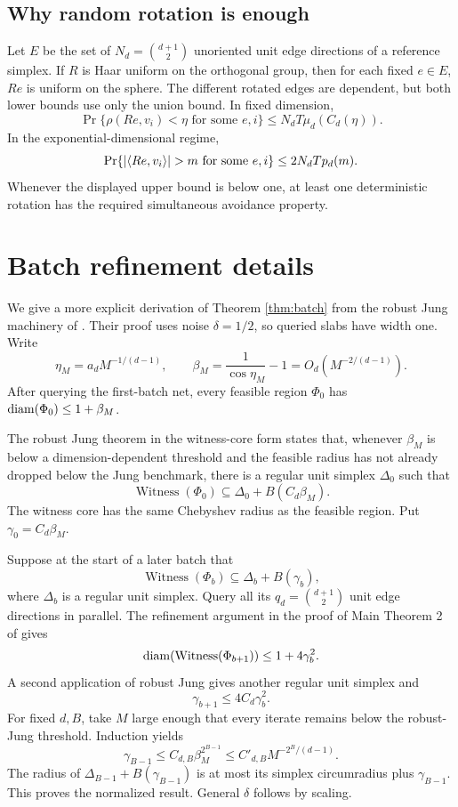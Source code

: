\subsection{Why random rotation is enough}

Let $E$ be the set of $N_d=\binom{d+1}{2}$ unoriented unit edge directions of
a reference simplex.  If $R$ is Haar uniform on the orthogonal group, then for
each fixed $e\in E$, $Re$ is uniform on the sphere.  The different rotated
edges are dependent, but both lower bounds use only the union bound.  In fixed
dimension,
\[
 \Pr\{\rho(Re,v_i)<\eta\text{ for some }e,i\}
 \leq N_dT\mu_d(C_d(\eta)).
\]
In the exponential-dimensional regime,
\[
 \Pr\{|\ip{Re}{v_i}|>m\text{ for some }e,i\}
 \leq2N_dTp_d(m).
\]
Whenever the displayed upper bound is below one, at least one deterministic
rotation has the required simultaneous avoidance property.

\section{Batch refinement details}                                 \label{app:batch}

We give a more explicit derivation of Theorem \ref{thm:batch} from the robust
Jung machinery of \citet{filmus2026optimal}.  Their proof uses noise
$\delta=1/2$, so queried slabs have width one.  Write
\[
 \eta_M=a_dM^{-1/(d-1)},\qquad
 \beta_M=\frac1{\cos\eta_M}-1=O_d(M^{-2/(d-1)}).
\]
After querying the first-batch net, every feasible region $\Phi_0$ has
$\operatorname{diam}(\Phi_0)\leq1+\beta_M$.

The robust Jung theorem in the witness-core form states that, whenever
$\beta_M$ is below a dimension-dependent threshold and the feasible radius has
not already dropped below the Jung benchmark, there is a regular unit simplex
$\Delta_0$ such that
\[
 \operatorname{Witness}(\Phi_0)
 \subseteq\Delta_0+B(C_d\beta_M).
\]
The witness core has the same Chebyshev radius as the feasible region.  Put
$\gamma_0=C_d\beta_M$.

Suppose at the start of a later batch that
\[
 \operatorname{Witness}(\Phi_b)
 \subseteq\Delta_b+B(\gamma_b),
\]
where $\Delta_b$ is a regular unit simplex.  Query all its
$q_d=\binom{d+1}{2}$ unit edge directions in parallel.  The refinement argument
in the proof of Main Theorem 2 of \citet{filmus2026optimal} gives
\[
 \operatorname{diam}(\operatorname{Witness}(\Phi_{b+1}))
 \leq1+4\gamma_b^2.
\]
A second application of robust Jung gives another regular unit simplex and
\[
 \gamma_{b+1}\leq4C_d\gamma_b^2.
\]
For fixed $d,B$, take $M$ large enough that every iterate remains below the
robust-Jung threshold.  Induction yields
\[
 \gamma_{B-1}
 \leq C_{d,B}\beta_M^{2^{B-1}}
 \leq C'_{d,B}M^{-2^B/(d-1)}.
\]
The radius of $\Delta_{B-1}+B(\gamma_{B-1})$ is at most its simplex
circumradius plus $\gamma_{B-1}$.  This proves the normalized result.  General
$\delta$ follows by scaling.

